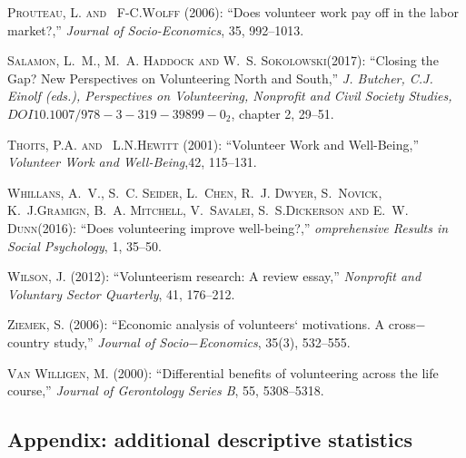 \documentclass[10pt, letterpaper]{article}
\begin{document}
\begin{spacing}{1.4}
\begin{thebibliography}{87}
\textsc{Prouteau, L. and ~F-C.Wolff } (2006): \enquote{Does volunteer work pay off in the labor market?,} \emph{Journal of Socio-Economics}, 35, 992--1013.

 \textsc{Salamon, L.~M., M.~A. Haddock and W.~S. Sokolowski}(2017):
 \enquote{Closing the Gap? New Perspectives on Volunteering North and South,} \emph{J. Butcher, C.J. Einolf (eds.), Perspectives on Volunteering, Nonprofit and Civil Society Studies, $DOI 10.1007/978-3-319-39899-0_2$}, chapter 2, 29--51.
  
\textsc{Thoits, P.A. and ~L.N.Hewitt } (2001): \enquote{Volunteer Work and Well-Being,} \emph{Volunteer Work and Well-Being},42, 115--131.


\textsc{Whillans, A.~V., S.~C. Seider, L.~Chen, R.~J. Dwyer, S.~Novick, K.~J.Gramign, B.~A. Mitchell, V.~Savalei, S.~S.Dickerson and E.~W. Dunn}(2016):
  \enquote{Does volunteering improve well-being?,} \emph{omprehensive Results in Social Psychology}, 1, 35--50.

  
\textsc{Wilson, J.} (2012): \enquote{Volunteerism research: A
  review essay,} \emph{Nonprofit and Voluntary Sector Quarterly}, 41, 176--212.

\textsc{Ziemek, S.} (2006): \enquote{Economic analysis of volunteers` motivations. A cross$-$country study,} \emph{Journal of Socio$-$Economics}, 35(3), 532--555.


\textsc{Van Willigen, M.} (2000): \enquote{Differential benefits of volunteering across the life course,} \emph{Journal of Gerontology Series B}, 55, 5308--5318.


\end{thebibliography}


\begin{spacing}{.9}

\section{Appendix: additional descriptive statistics}



\end{spacing}
\end{spacing}
\end{document}
